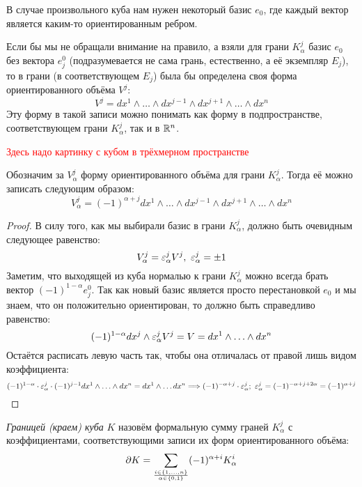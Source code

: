 \begin{anote}
	В случае произвольного куба нам нужен некоторый базис $e_0$, где каждый вектор является каким-то ориентированным ребром.
\end{anote}

\begin{anote}
	Если бы мы не обращали внимание на правило, а взяли для грани $K_\alpha^j$ базис $e_0$ без вектора $e_j^0$ (подразумевается не сама грань, естественно, а её экземпляр $E_j$), то в грани (в соответствующем $E_j$) была бы определена своя форма ориентированного объёма $V^j$:
	\[
		V^j = dx^1 \wedge \ldots \wedge dx^{j - 1} \wedge dx^{j + 1} \wedge \ldots \wedge dx^n
	\]
	Эту форму в такой записи можно понимать как форму в подпространстве, соответствующем грани $K_\alpha^j$, так и в $\mathbb{R}^n$.
\end{anote}

\textcolor{red}{Здесь надо картинку с кубом в трёхмерном пространстве}

\begin{proposition}
	Обозначим за $V_\alpha^j$ форму ориентированного объёма для грани $K_\alpha^j$. Тогда её можно записать следующим образом:
	\[
		V_\alpha^j = (-1)^{\alpha + j} dx^1 \wedge \ldots \wedge dx^{j - 1} \wedge dx^{j + 1} \wedge \ldots \wedge dx^n
	\]
\end{proposition}

\begin{proof}
	В силу того, как мы выбирали базис в грани $K_\alpha^j$, должно быть очевидным следующее равенство:
	\[
		V_\alpha^j = \varepsilon_\alpha^j V^j,\ \varepsilon_\alpha^j = \pm 1
	\]
	Заметим, что выходящей из куба нормалью к грани $K_\alpha^j$ можно всегда брать вектор $(-1)^{1 - \alpha}e_j^0$. Так как новый базис является просто перестановкой $e_0$ и мы знаем, что он положительно ориентирован, то должно быть справедливо равенство:
	\[
		(-1)^{1 - \alpha} dx^j \wedge \varepsilon_\alpha^j V^j = V = dx^1 \wedge \ldots \wedge dx^n
	\]
	Остаётся расписать левую часть так, чтобы она отличалась от правой лишь видом коэффициента:
	\[
		(-1)^{1 - \alpha} \cdot \eps_\alpha^j \cdot (-1)^{j - 1} dx^1 \wedge \ldots \wedge dx^n = dx^1 \wedge \ldots dx^n \Lora (-1)^{-\alpha + j} \cdot \eps_\alpha^j;\ \eps_\alpha^j = (-1)^{-\alpha + j + 2\alpha} = (-1)^{\alpha + j}
	\]
\end{proof}

\begin{definition}
	\textit{Границей (краем) куба} $K$ назовём формальную сумму граней $K_\alpha^j$ с коэффициентами, соответствующими записи их форм ориентированного объёма:
	\[
		\partial K = \sum_{i \in \{1, \ldots, n\} \over {\alpha \in \{0, 1\}}} (-1)^{\alpha + i} K_\alpha^i
	\]
\end{definition}

